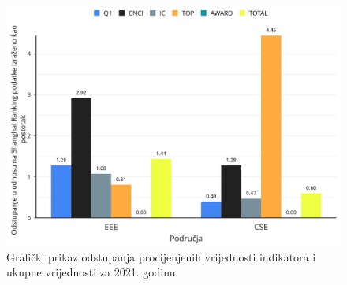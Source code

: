 \documentclass[times, utf8, zavrsni]{fer}
\begin{document}
    \begin{figure}[htb]
        \centering
        \includegraphics[scale=0.28]{graf2021.png}
        \caption{Grafički prikaz odstupanja procijenjenih vrijednosti indikatora i ukupne vrijednosti  za 2021. godinu}
        \label{fig:graf2021}
        \end{figure}   
        \FloatBarrier 
\end{document}
